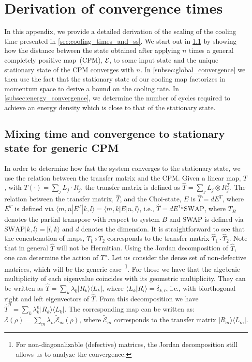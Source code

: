 \section{Derivation of convergence times}
\label{app:secIV_calculations}


In this appendix, we provide a detailed derivation of the scaling of the cooling time presented in \cref{sec:cooling_times_and_ss}.
We start out in \cref{subsec:zeroth_order_mixing_time} by showing how the distance between the state obtained after applying $n$ times a general completely positive map~(CPM), ${\cal E}$, to some input state and the unique stationary state of the CPM converges with $n$. In \cref{subsec:global_convergence} we then use the fact that the stationary state of our cooling map factorizes in momentum space to derive a bound on the cooling rate. In \cref{subsec:energy_convergence}, we determine the number of cycles required to achieve an energy density which is close to that of the stationary state.


\subsection{Mixing time and convergence to stationary state for generic CPM}
\label{subsec:zeroth_order_mixing_time}

In order to determine how fast the system converges to the stationary state, we use the relation between the transfer matrix and the CPM. Given a linear map, $T$, with $T(\cdot)=\sum_j L_j \cdot R_j$, the transfer matrix is defined as $\hat{T}=\sum_j L_j \otimes R_j^T$. The relation between the transfer matrix, $\hat{T}$, and the Choi-state, $E$ is $\hat{T}=d E^T$, where $E^T$ is defined via $\langle m,n|E^T | k,l\rangle=\langle m,k|E|n,l\rangle$, i.e., $\hat{T}=d E^{T_B} \text{SWAP}$, where $T_B$ denotes the partial transpose with respect to system $B$ and SWAP is defined via $\text{SWAP} |k,l\rangle=|l,k\rangle$ and $d$ denotes the dimension. It is straightforward to see that the concatenation of maps, $T_1 \circ T_2$ corresponds to the transfer matrix $\hat{T}_1 \cdot \hat{T}_2$. Note that in general $\hat{T}$ will not be Hermitian. Using the Jordan decomposition of $\hat{T}$, one can determine the action of $T^n$. Let us consider the dense set of non-defective matrices, which will be the generic case~\footnote{For non-diagonalizable (defective) matrices, the Jordan decomposition still allows us to analyze the convergence.}. For those we have that the algebraic multiplicity of each eigenvalue coincides with its geometric multiplicity.
They can be written as $\hat{T}=\sum_k \lambda_k |R_k\rangle \langle L_k|$, where $\langle L_k|R_l\rangle =\delta_{k,l}$, i.e., with biorthogonal right and left eigenvectors of $\hat{T}$. From this decomposition we have $\hat{T}^n = \sum_k \lambda_k^n |R_k\rangle \langle L_k|$. The corresponding map can be written as: $\mathcal{E}(\rho) = \sum_{m} \lambda_m \tilde{\mathcal{E}}_m(\rho)$, where $\tilde{\mathcal{E}}_m$ corresponds to the transfer matrix $ |R_m\rangle \langle L_m|$.


